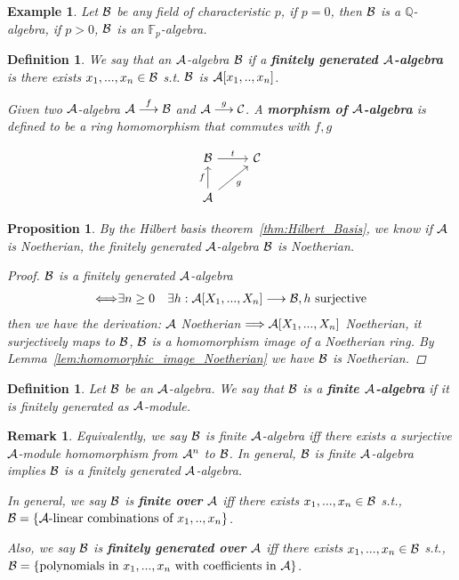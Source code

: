 \documentclass[11pt]{article}
\newtheorem{prop}[thm]{Proposition}
\newtheorem{dfn}[thm]{Definition}
\newtheorem{rmk}[thm]{Remark}
\newtheorem{ex}[thm]{Example}
\newcommand{\bbf}{\mathbb F}
\newcommand{\ratl}{\mathbb Q}
\newcommand{\cala}{{\cal A}}
\newcommand{\calb}{{\cal B}}
\newcommand{\calc}{{\cal C}}
\newcommand{\Lrta}{\Longrightarrow}
\newcommand{\lrta}{\longrightarrow}
\newcommand{\Llrta}{\Longleftrightarrow}
\begin{document}
\begin{ex}
Let $\calb$ be any field of characteristic $p$, if $p=0$, then $\calb$ is a $\ratl$-algebra, if $p>0$, $\calb$ is an $\bbf_p$-algebra.
\end{ex}

\begin{dfn}
We say that an $\cala$-algebra $\calb$ if a \textbf{finitely generated $\cala$-algebra} is there exists $x_1,...,x_n\in \calb$ s.t. $\calb$ is $\cala[x_1,..,x_n]$. 

Given two $\cala$-algebra $\cala\overset{f}{\lrta}\calb$ and $\cala\overset{g}{\lrta}\calc$. A \textbf{morphism of $\cala$-algebra} is defined to be a ring homomorphism that commutes with $f,g$

\[
\begin{tikzcd}
\calb\ar[r, "t"]&\calc\\
\cala \ar[u, "f"]\ar[ur,swap, "g"] 
\end{tikzcd}
\] 
\end{dfn}

\begin{prop}
By the Hilbert basis theorem~\ref{thm:Hilbert_Basis}, we know if $\cala$ is Noetherian, the finitely generated $\cala$-algebra $\calb$ is Noetherian.
\begin{proof}
$\calb$ is a finitely generated $\cala$-algebra\\
$$
\begin{aligned}
\Llrta &\exists n\geq 0
& \exists h:\cala[X_1,...,X_n]\lrta \calb, h\text{ surjective}
\end{aligned}
$$
then we have the derivation: $\cala$ Noetherian $\Lrta \cala[X_1,...,X_n]$ Noetherian, it surjectively maps to $\calb$, $\calb$ is a homomorphism image of a Noetherian ring. By Lemma~\ref{lem:homomorphic_image_Noetherian} we have $\calb$ is Noetherian.
\end{proof}
\end{prop}

\begin{dfn} Let $\calb$ be an $\cala$-algebra.
We say that $\calb$ is a\textbf{ finite $\cala$-algebra} if it is finitely generated as $\cala$-module. 
 \end{dfn}

\begin{rmk}
Equivalently, we say $\calb$ is finite $\cala$-algebra iff there exists a surjective $\cala$-module homomorphism from $\cala^n$ to $\calb$. In general, $\calb$ is finite $\cala$-algebra implies $\calb$ is a finitely generated $\cala$-algebra.

In general, we say $\calb$ is \textbf{finite over} $\cala$ iff there exists $x_1,...,x_n\in\calb$ s.t., $\calb=\{\cala\text{-linear combinations of $x_1,..,x_n$}\}$. 

Also, we say $\calb$ is \textbf{finitely generated over} $\cala$ iff there exists $x_1,...,x_n\in\calb$ s.t., $\calb=\{\text{polynomials in $x_1,...,x_n$ with coefficients in $\cala$}\}$.
\end{rmk}
\end{document}
